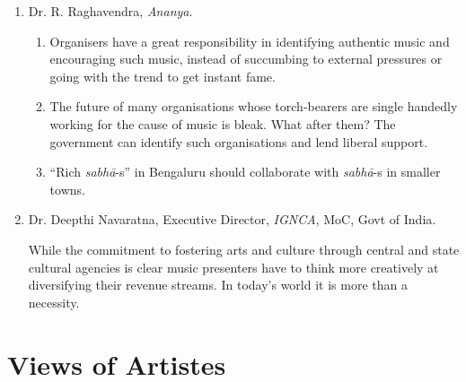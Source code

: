 \begin{enumerate}
 \newpage

 \item Dr. R. Raghavendra, \textit{Ananya}.
 
\begin{enumerate}
\itemsep=0pt

 \item Organisers have a great responsibility in identifying authentic music and encouraging such music, instead of succumbing to external pressures or going with the trend to get instant fame.

 \item The future of many organisations whose torch-bearers are single handedly working for the cause of music is bleak. What after them? The government can identify such organisations and lend liberal support.

 \item “Rich \textit{sabhā}-s” in Bengaluru should collaborate with \textit{sabhā}-s in smaller towns.
\end{enumerate}


 \item 
 Dr. Deepthi Navaratna, Executive Director, \textit{IGNCA}, MoC, Govt of India.

 While the commitment to fostering arts and culture through central and state cultural agencies is clear music presenters have to think more creatively at diversifying their revenue streams. In today’s world it is more than a necessity.

\end{enumerate}

\vspace{-.5cm}

\section*{Views of Artistes}

